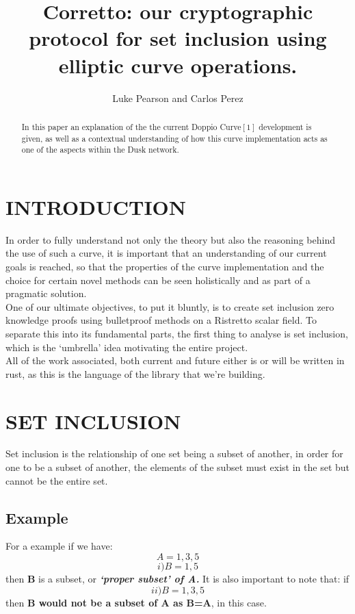 \documentclass[letterpaper, 10 pt, conference]{ieeeconf}  %
\title{\LARGE \bf
Corretto: our cryptographic protocol for set inclusion using elliptic curve operations.  
}
\author{Luke Pearson and Carlos Perez}
\begin{document}
\maketitle
\thispagestyle{empty}
\pagestyle{empty}


\begin{abstract}

In this paper an explanation of the the current Doppio Curve$[1]$ development is given, as well as a contextual understanding of how this curve implementation acts as one of the aspects within the Dusk network.

\end{abstract}


\section{INTRODUCTION}

In order to fully understand not only the theory but also the reasoning behind the use of such a curve, it is important that an understanding of our current goals is reached, so that the properties of the curve implementation and the choice for certain novel methods can be seen holistically and as part of a pragmatic solution. \\
One of our ultimate objectives, to put it bluntly, is to create set inclusion zero knowledge proofs using bulletproof methods on a Ristretto scalar field. To separate this into its fundamental parts, the first thing to analyse is set inclusion, which is the ‘umbrella’ idea motivating the entire project. \\ 
All of the work associated, both current and future either is or will be written in rust, as this is the language of the library that we’re building. 

\section{SET INCLUSION}

Set inclusion is the relationship of one set being a subset of another, in order for one to be a subset of another, the elements of the subset must exist in the set but cannot be the entire set. 
\subsection{Example}
For a example if we have:  $$ A={1,3,5} $$
$$ i) B={1,5} $$ then \textbf{B} is a subset, or \textbf{\textit{‘proper subset’ of A.}} 
It is also important to note that: if $$ ii) B={1,3,5} $$ then \textbf{B would not be a subset of A as B=A}, in this case. 
\end{document}
